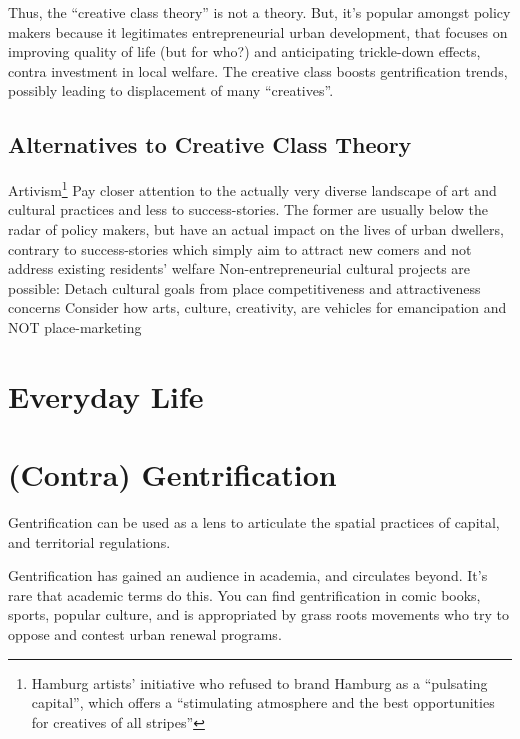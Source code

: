 \documentclass{article}
\begin{document}
Thus, the ``creative class theory'' is not a theory. But, it's popular amongst policy makers because it legitimates entrepreneurial urban development, that focuses on improving quality of life (but for who?) and anticipating trickle-down effects, contra investment in local welfare. The creative class boosts gentrification trends, possibly leading to displacement of many ``creatives''.

\subsection{Alternatives to Creative Class Theory}

\begin{outline}
	\1 Artivism\footnote{Hamburg artists' initiative who refused to brand Hamburg as a ``pulsating capital'', which offers a ``stimulating atmosphere and the best opportunities for creatives of all stripes''}
	\1 Pay closer attention to the actually very diverse landscape of art and cultural practices and less to success-stories. The former are usually below the radar of policy makers, but have an actual impact on the lives of urban dwellers, contrary to success-stories which simply aim to attract new comers and not address existing residents' welfare
	\1 Non-entrepreneurial cultural projects are possible:
		\2 Detach cultural goals from place competitiveness and attractiveness concerns
		\2 Consider how arts, culture, creativity, are vehicles for emancipation and NOT place-marketing 
\end{outline}



\section{Everyday Life}

\section{(Contra) Gentrification}

Gentrification can be used as a lens to articulate the spatial practices of capital, and territorial regulations.

Gentrification has gained an audience in academia, and circulates beyond. It's rare that academic terms do this. You can find gentrification in comic books, sports, popular culture, and is appropriated by grass roots movements who try to oppose and contest urban renewal programs.
\end{document}

